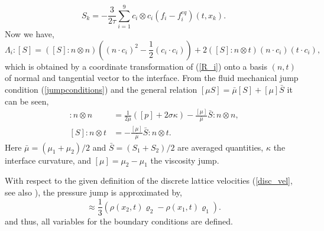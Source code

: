 \documentclass[final,leqno,onefignum,onetabnum]{siamltexmm}
\begin{document}
\begin{equation}
  S_k = -\frac{3}{2\tau } \sum_{i=1}^9 c_i \otimes c_i(f_i-f_i^{eq})(t,x_k) \text{.}
\end{equation}
Now we have,
\begin{equation}
  \Lambda_i:[S] = ([S]:n \otimes n)((n \cdot c_i)^2 - \frac12 (c_i \cdot c_i)) + 2([S]:n \otimes t)(n \cdot c_i)(t \cdot c_i) \text{,}
  \label{Lambda_iTimes_S}
\end{equation}
which is obtained by a coordinate transformation of (\ref{R_i}) onto a basis $(n, t)$ of normal and tangential vector to the interface. From the fluid mechanical jump condition (\ref{jumpconditions}) and the general relation $[\mu S] = \bar{\mu}[S] + [\mu]\bar{S} $ it can be seen,
\begin{align}
  [S]:n \otimes n &=  \frac{1}{2 \bar\mu} ([p] + 2 \sigma \kappa) - \frac{[\mu]}{\bar{\mu}} \bar{S} : n \otimes n \text{,} \\
  [S]:n \otimes t &= - \frac{[\mu]}{\bar{\mu}} \bar{S} : n \otimes t \text{.}
\end{align}
Here $\bar{\mu} = (\mu_1 + \mu_2)/2$ and $\bar{S} = (S_1 + S_2)/2$ are averaged quantities, $\kappa$ the interface curvature, and  $[\mu] = \mu_2 - \mu_1$ the viscosity jump.

With respect to the given definition of the discrete lattice velocities (\ref{disc_vel}, see also \cite{Thoemmes2}), the pressure jump is approximated by,
\begin{equation}
	[p] \approx \frac{1}{3} (\rho(x_2,t)\varrho_2 - \rho(x_1,t)\varrho_1) \text{.}
\end{equation}
and thus, all variables for the boundary conditions are defined. 
\end{document}
